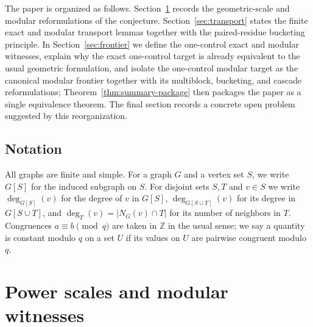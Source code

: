 \documentclass[11pt]{amsart}
\theoremstyle{definition}
\newcommand{\Z}{\mathbb{Z}}
\begin{document}
\medskip

The paper is organized as follows. Section~\ref{sec:powerscales} records the geometric-scale and
modular reformulations of the conjecture. Section~\ref{sec:transport} states the finite exact and
modular transport lemmas together with the paired-residue bucketing principle. In
Section~\ref{sec:frontier} we define the one-control exact and modular witnesses, explain why the
exact one-control target is already equivalent to the usual geometric formulation, and isolate the
one-control modular target as the canonical modular frontier together with its multiblock,
bucketing, and cascade reformulations; Theorem~\ref{thm:summary-package} then packages the paper as
a single equivalence theorem. The final section records a concrete open problem suggested by this
reorganization.

\subsection*{Notation}
All graphs are finite and simple. For a graph $G$ and a vertex set $S$, we write $G[S]$ for the
induced subgraph on $S$. For disjoint sets $S,T$ and $v \in S$ we write $\deg_{G[S]}(v)$ for the
degree of $v$ in $G[S]$, $\deg_{G[S\cup T]}(v)$ for its degree in $G[S \cup T]$, and
$\deg_T(v) = |N_G(v)\cap T|$ for its number of neighbors in $T$. Congruences $a \equiv b\pmod q$
are taken in $\Z$ in the usual sense; we say a quantity is constant modulo $q$ on a set $U$ if
its values on $U$ are pairwise congruent modulo $q$.



\section{Power scales and modular witnesses}\label{sec:powerscales}
\end{document}
